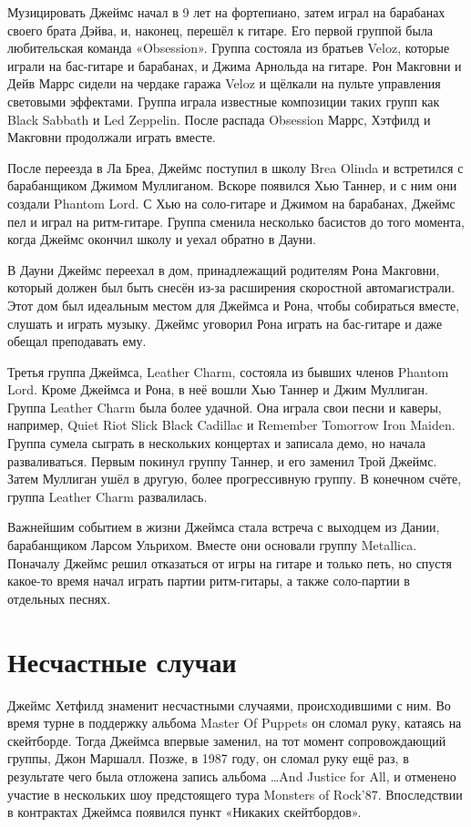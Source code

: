 \documentclass[a4paper,12pt,leqno]{article}
\theoremstyle{plain} %
\theoremstyle{definition} %
\theoremstyle{remark} %
\begin{document}
Музицировать Джеймс начал в 9 лет на фортепиано, затем играл на барабанах своего брата Дэйва, и, наконец, перешёл к гитаре. Его первой группой была любительская команда «Obsession». Группа состояла из братьев Veloz, которые играли на бас-гитаре и барабанах, и Джима Арнольда на гитаре. Рон Макговни и Дейв Маррс сидели на чердаке гаража Veloz и щёлкали на пульте управления световыми эффектами. Группа играла известные композиции таких групп как Black Sabbath и Led Zeppelin. После распада Obsession Маррс, Хэтфилд и Макговни продолжали играть вместе.

После переезда в Ла Бреа, Джеймс поступил в школу Brea Olinda и встретился с барабанщиком Джимом Муллиганом. Вскоре появился Хью Таннер, и с ним они создали Phantom Lord. С Хью на соло-гитаре и Джимом на барабанах, Джеймс пел и играл на ритм-гитаре. Группа сменила несколько басистов до того момента, когда Джеймс окончил школу и уехал обратно в Дауни.

В Дауни Джеймс переехал в дом, принадлежащий родителям Рона Макговни, который должен был быть снесён из-за расширения скоростной автомагистрали. Этот дом был идеальным местом для Джеймса и Рона, чтобы собираться вместе, слушать и играть музыку. Джеймс уговорил Рона играть на бас-гитаре и даже обещал преподавать ему.

Третья группа Джеймса, Leather Charm, состояла из бывших членов Phantom Lord. Кроме Джеймса и Рона, в неё вошли Хью Таннер и Джим Муллиган. Группа Leather Charm была более удачной. Она играла свои песни и каверы, например, Quiet Riot Slick Black Cadillac и Remember Tomorrow Iron Maiden. Группа сумела сыграть в нескольких концертах и записала демо, но начала разваливаться. Первым покинул группу Таннер, и его заменил Трой Джеймс. Затем Муллиган ушёл в другую, более прогрессивную группу. В конечном счёте, группа Leather Charm развалилась.

Важнейшим событием в жизни Джеймса стала встреча с выходцем из Дании, барабанщиком Ларсом Ульрихом. Вместе они основали группу Metallica. Поначалу Джеймс решил отказаться от игры на гитаре и только петь, но спустя какое-то время начал играть партии ритм-гитары, а также соло-партии в отдельных песнях.

\section{Несчастные случаи}

Джеймс Хетфилд знаменит несчастными случаями, происходившими с ним. Во время турне в поддержку альбома Master Of Puppets он сломал руку, катаясь на скейтборде. Тогда Джеймса впервые заменил, на тот момент сопровождающий группы, Джон Маршалл. Позже, в 1987 году, он сломал руку ещё раз, в результате чего была отложена запись альбома …And Justice for All, и отменено участие в нескольких шоу предстоящего тура Monsters of Rock’87. Впоследствии в контрактах Джеймса появился пункт «Никаких скейтбордов».
\end{document}
